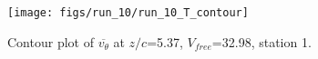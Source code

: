 \begin{figure}[H]
\centering
\texttt{[image: figs/run\_10/run\_10\_T\_contour]}
\caption{Contour plot of $\overline{v_{\theta}}$ at $z/c$=5.37, $V_{free}$=32.98, station 1.}
\label{fig:run_10_T_contour}
\end{figure}


